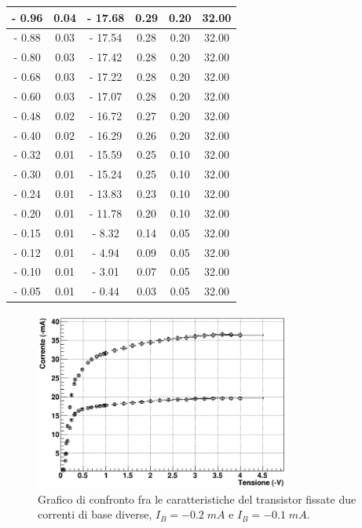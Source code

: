 \documentclass[a4paper, 11pt]{article}
\begin{document}
\begin{longtable}{|c|c|c|c|c|c|}
        \hline 
        - 0.96 & 0.04 & - 17.68 & 0.29 & 0.20 & 32.00 \\
        \hline 
        - 0.88 & 0.03 & - 17.54 & 0.28 & 0.20 & 32.00 \\
        \hline 
        - 0.80 & 0.03 & - 17.42 & 0.28 & 0.20 & 32.00 \\
        \hline 
        - 0.68 & 0.03 & - 17.22 & 0.28 & 0.20 & 32.00 \\
        \hline 
        - 0.60 & 0.03 & - 17.07 & 0.28 & 0.20 & 32.00 \\
        \hline 
        - 0.48 & 0.02 & - 16.72 & 0.27 & 0.20 & 32.00 \\
        \hline 
        - 0.40 & 0.02 & - 16.29 & 0.26 & 0.20 & 32.00 \\
        \hline 
        - 0.32 & 0.01 & - 15.59 & 0.25 & 0.10 & 32.00 \\
        \hline 
        - 0.30 & 0.01 & - 15.24 & 0.25 & 0.10 & 32.00 \\
        \hline 
        - 0.24 & 0.01 & - 13.83 & 0.23 & 0.10 & 32.00 \\
        \hline 
        - 0.20 & 0.01 & - 11.78 & 0.20 & 0.10 & 32.00 \\
        \hline 
        - 0.15 & 0.01 & - 8.32 & 0.14 & 0.05 & 32.00 \\
        \hline 
        - 0.12 & 0.01 & - 4.94 & 0.09 &	0.05 & 32.00 \\
        \hline 
        - 0.10 & 0.01 & - 3.01 & 0.07 &	0.05 & 32.00 \\
        \hline 
        - 0.05 & 0.01 & - 0.44 & 0.03 &	0.05 & 32.00 \\
        \hline 
\end{longtable}

\begin{figure}[!htb]
    \centering
    \includegraphics[width=0.75\textwidth]{Immagini - Seconda prova/Grafico totale.png}
    \caption{Grafico di confronto fra le caratteristiche del transistor fissate due correnti di base diverse, $I_B = -0.2 \;mA $ e $I_B = -0.1 \;mA$.}
    \label{fig:g-tot}
\end{figure}
\end{document}
